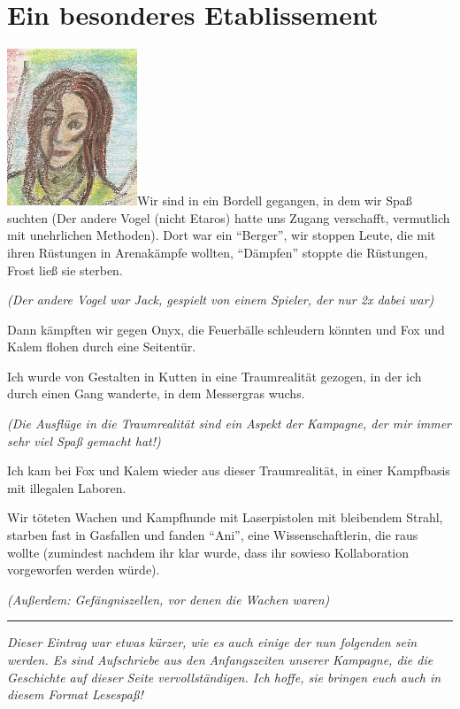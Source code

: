 \documentclass[11pt]{article}
\begin{document}
\section{Ein besonderes Etablissement}

\includegraphics{sskreszta-portrait-alt-klein.png}Wir sind in ein
Bordell gegangen, in dem wir Spaß suchten (Der andere Vogel (nicht
Etaros) hatte uns Zugang verschafft, vermutlich mit unehrlichen
Methoden). Dort war ein ``Berger'', wir stoppen Leute, die mit ihren
Rüstungen in Arenakämpfe wollten, ``Dämpfen'' stoppte die Rüstungen,
Frost ließ sie sterben.

\emph{(Der andere Vogel war Jack, gespielt von einem Spieler, der nur 2x
dabei war)}

Dann kämpften wir gegen Onyx, die Feuerbälle schleudern könnten und Fox
und Kalem flohen durch eine Seitentür.

Ich wurde von Gestalten in Kutten in eine Traumrealität gezogen, in der
ich durch einen Gang wanderte, in dem Messergras wuchs.

\emph{(Die Ausflüge in die Traumrealität sind ein Aspekt der Kampagne,
der mir immer sehr viel Spaß gemacht hat!)}

Ich kam bei Fox und Kalem wieder aus dieser Traumrealität, in einer
Kampfbasis mit illegalen Laboren.

Wir töteten Wachen und Kampfhunde mit Laserpistolen mit bleibendem
Strahl, starben fast in Gasfallen und fanden ``Ani'', eine
Wissenschaftlerin, die raus wollte (zumindest nachdem ihr klar wurde,
dass ihr sowieso Kollaboration vorgeworfen werden würde).

\emph{(Außerdem: Gefängniszellen, vor denen die Wachen waren)}

\begin{center}\rule{3in}{0.4pt}\end{center}

\emph{Dieser Eintrag war etwas kürzer, wie es auch einige der nun
folgenden sein werden. Es sind Aufschriebe aus den Anfangszeiten unserer
Kampagne, die die Geschichte auf dieser Seite vervollständigen. Ich
hoffe, sie bringen euch auch in diesem Format Lesespaß!}
\end{document}
